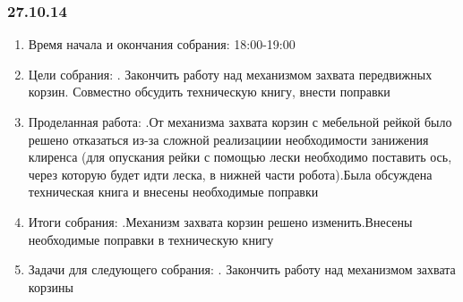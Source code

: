 \documentclass[12pt]{article}
\begin{document}
	         \subsubsection{27.10.14}
	         \begin{enumerate}
	         	\item Время начала и окончания собрания:
	         	18:00-19:00
	         	\newline
	         	\item Цели собрания:
	         	. Закончить работу над механизмом захвата передвижных корзин. Совместно обсудить техническую книгу, внести поправки
	         	\item Проделанная работа:
	         	.От механизма захвата корзин с мебельной рейкой было решено отказаться из-за сложной реализациии необходимости занижения клиренса (для опускания рейки с помощью лески необходимо поставить ось, через которую будет идти леска, в нижней части робота).Была обсуждена техническая книга и внесены необходимые поправки 
	         	\item Итоги собрания:
	         	.Механизм захвата корзин решено изменить.Внесены необходимые поправки в техническую книгу
	         	\item Задачи для следующего собрания:
	         	. Закончить работу над механизмом захвата корзины
	         \end{enumerate}
	         \newpage
\end{document}
